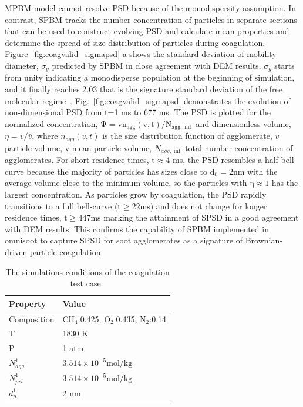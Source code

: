 MPBM model cannot resolve PSD because of the monodispersity assumption. In contrast, SPBM tracks the number concentration of particles in separate sections that can be used to construct evolving PSD and calculate mean properties and determine the spread of size distribution of particles during coagulation. Figure~\ref{fig:coagvalid_sigmapsd}-a shows the standard deviation of mobility diameter, ${\sigma_g}$ predicted by SPBM in close agreement with DEM results. ${\sigma_g}$ starts from unity indicating a monodisperse population at the beginning of simulation, and it finally reaches 2.03 that is the signature standard deviation of the free molecular regime~\citep{vemury1995self}. Fig.~\ref{fig:coagvalid_sigmapsd} demonstrates the evolution of non-dimensional PSD from t=1 ms to 677 ms. The PSD is plotted for the normalized concentration, $\mathrm{\Psi= \bar{v}n_{agg}(v,t)/N_{agg,\inf}}$ and dimensionless volume, ${\eta= v/ \bar{v}}$, where ${n_{agg}(v,t)}$ is the size distribution function of agglomerate, ${v}$ particle volume, $\mathrm{\bar{v}}$ mean particle volume, ${N_{agg,\inf}}$ total number concentration of agglomerates. For short residence times, t$\approx$4 ms, the PSD resembles a half bell curve because the majority of particles has sizes close to $\mathrm{d_0=2 nm}$ with the average volume close to the minimum volume, so the particles with $\mathrm{\eta\approx1}$ has the largest concentration. As particles grow by coagulation, the PSD rapidly transitions to a full bell-curve ($\mathrm{t\ge22 ms}$) and does not change for longer residence times, $\mathrm{t\ge447 ms}$ marking the attainment of SPSD in a good agreement with DEM results. This confirms the capability of SPBM implemented in omnisoot to capture SPSD for soot agglomerates as a signature of Brownian-driven particle coagulation.  

\begin{table}
	\caption{The simulations conditions of the coagulation test case~\citep{kholghy2021surface}}
	\label{tab:simcond_coagtest}
	\centering
	\begin{tabular}{l l}
		\hline
		\textbf{Property} & \textbf{Value} \\
		\hline
		Composition & $\mathrm{CH_4}$:0.425, $\mathrm{O_2}$:0.435, $\mathrm{N_2}$:0.14\\
		T & 1830 K\\
		P & 1 atm \\
		${N^1_{agg}}$ & $3.514\times10^{-5} \mathrm{mol/kg}$ \\ 
		${N^1_{pri}}$ & $3.514\times10^{-5} \mathrm{mol/kg}$\\
		${d^1_{p}}$ & 2 nm \\
		\hline
	\end{tabular}
\end{table}


